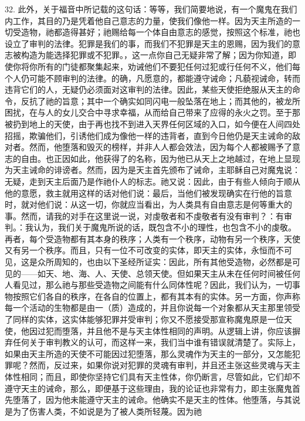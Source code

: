 32. 此外，关于福音中所记载的这句话：等等，我们简要地说，有一个魔鬼在我们内工作，其目的乃是凭着他自己意志的力量，使我们像他一样。因为天主所造的一切受造物，祂都造得甚好；祂赐给每一个体自由意志的感觉，按照这个标准，祂也设立了审判的法律。犯罪是我们的事，而我们不犯罪是天主的恩赐，因为我们的意志被构造为能选择犯罪或不犯罪。，这一点你自己无疑非常了解；因为你知道，即使你将你所有的门徒都聚集起来，劝诫他们不要犯任何过犯或行任何不义，他们每个人仍可能不顾审判的法律。的确，凡愿意的，都能遵守诫命；凡藐视诫命，转而违背它们的人，无疑仍必须面对这审判的法律。因此，某些天使拒绝服从天主的命令，反抗了祂的旨意；其中一个确实如同闪电一般坠落在地上；而其他的，被龙所困扰，在与人的女儿交合中寻求幸福，从而给自己带来了应得的永火之罚。至于那被扔到地上的天使，由于再也找不到进入天界任何区域的入口，如今便在人间四处招摇，欺骗他们，引诱他们成为像他一样的违背者，直到今日他仍是天主诫命的敌对者。然而，他堕落和毁灭的榜样，并非人人都会效法，因为每个人都被赐予了意志的自由。也正因如此，他获得了的名称，因为他已从天上之地越过，在地上显现为天主诫命的诽谤者。然而，因为是天主首先颁布了诫命，主耶稣自己对魔鬼说：无疑，走到天主后面乃是作祂仆人的标志。祂又说：因此，由于有些人倾向于顺从他的意愿，救主就用这样的话对他们说：最后，当他们被发现确实在行他的旨意时，就对他们说：从这一切，你就应当看出，为人类具有自由意志是何等重大的事。然而，请我的对手在这里说一说，对虔敬者和不虔敬者有没有审判？：有审判。：我认为，我们关于魔鬼所说的话，既包含不小的理性，也包含不小的虔敬。再者，每个受造物都有其本身的秩序；人类有一个秩序，动物有另一个秩序，天使又有另一个秩序。而且，只有一位不可改变的实体，即天主的实体，永恒而不可见，这是众所周知的，也由以下圣经所证实：因此，所有其他受造物，必然都是可见的——如天、地、海、人、天使、总领天使。但如果天主从未在任何时间被任何人看见过，那么祂与那些受造物之间能有什么同体性呢？因此，我们认为，一切事物按照它们各自的秩序，在各自的位置上，都有其本有的实体。另一方面，你声称每一个活动的生物都是由一（质）造成的，并且你说每一个对象都从天主那里领受了同样的实体，这实体能够犯罪并受审判；你又不愿接受那宣称魔鬼原是一位天使，他因过犯而堕落，并且他不是与天主体性相同的声明。从逻辑上讲，你应该摒弃任何关于审判教义的认可，而这样一来，我们当中谁有错误就清楚了。实际上，如果由天主所造的天使不可能因过犯堕落，那么灵魂作为天主的一部分，又怎能犯罪呢？然而，反过来，如果你说对犯罪的灵魂有审判，并且还主张这些灵魂与天主体性相同；而且，即使你坚持它们具有天主性体，你仍断言，尽管如此，它们却不遵守天主的诫命，那么，即便基于这些理由，我的论证也非常有力，即主张魔鬼首先堕落了，因为他未能遵守天主的诫命。他确实不是天主的性体。他堕落，与其说是为了伤害人类，不如说是为了被人类所轻蔑。因为祂\par

